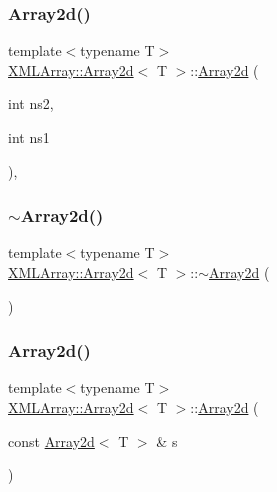 \subsubsection{\texorpdfstring{Array2d()}{Array2d()}\hspace{0.1cm}{\footnotesize\ttfamily [5/9]}}
{\footnotesize\ttfamily template$<$typename T$>$ \\
\mbox{\hyperlink{classXMLArray_1_1Array2d}{X\+M\+L\+Array\+::\+Array2d}}$<$ T $>$\+::\mbox{\hyperlink{classXMLArray_1_1Array2d}{Array2d}} (\begin{DoxyParamCaption}\item[{int}]{ns2,  }\item[{int}]{ns1 }\end{DoxyParamCaption})\hspace{0.3cm}{\ttfamily [inline]}, {\ttfamily [explicit]}}

\mbox{\label{classXMLArray_1_1Array2d_a57639b142c7754fa2c11bb3ac5ee76d7}} 
\subsubsection{\texorpdfstring{$\sim$Array2d()}{~Array2d()}\hspace{0.1cm}{\footnotesize\ttfamily [2/3]}}
{\footnotesize\ttfamily template$<$typename T$>$ \\
\mbox{\hyperlink{classXMLArray_1_1Array2d}{X\+M\+L\+Array\+::\+Array2d}}$<$ T $>$\+::$\sim$\mbox{\hyperlink{classXMLArray_1_1Array2d}{Array2d}} (\begin{DoxyParamCaption}{ }\end{DoxyParamCaption})\hspace{0.3cm}{\ttfamily [inline]}}

\mbox{\label{classXMLArray_1_1Array2d_a0646ba9d0ce7616c1cc4a84a4794b186}} 
\subsubsection{\texorpdfstring{Array2d()}{Array2d()}\hspace{0.1cm}{\footnotesize\ttfamily [6/9]}}
{\footnotesize\ttfamily template$<$typename T$>$ \\
\mbox{\hyperlink{classXMLArray_1_1Array2d}{X\+M\+L\+Array\+::\+Array2d}}$<$ T $>$\+::\mbox{\hyperlink{classXMLArray_1_1Array2d}{Array2d}} (\begin{DoxyParamCaption}\item[{const \mbox{\hyperlink{classXMLArray_1_1Array2d}{Array2d}}$<$ T $>$ \&}]{s }\end{DoxyParamCaption})\hspace{0.3cm}{\ttfamily [inline]}}



